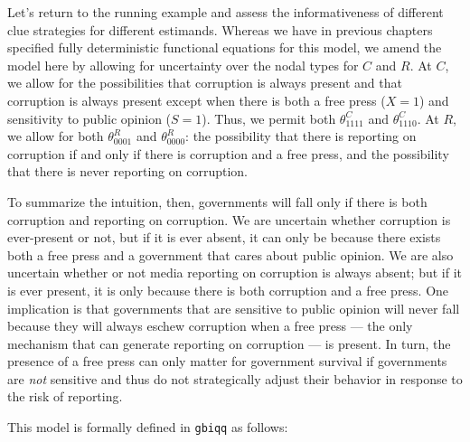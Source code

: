 \documentclass[
  12pt,
]{book}
\newenvironment{Shaded}{\begin{snugshade}}{\end{snugshade}}
\newcommand{\DataTypeTok}[1]{\textcolor[rgb]{0.13,0.29,0.53}{#1}}
\newcommand{\KeywordTok}[1]{\textcolor[rgb]{0.13,0.29,0.53}{\textbf{#1}}}
\newcommand{\NormalTok}[1]{#1}
\newcommand{\OperatorTok}[1]{\textcolor[rgb]{0.81,0.36,0.00}{\textbf{#1}}}
\newcommand{\OtherTok}[1]{\textcolor[rgb]{0.56,0.35,0.01}{#1}}
\newcommand{\StringTok}[1]{\textcolor[rgb]{0.31,0.60,0.02}{#1}}
\begin{document}
Let's return to the running example and assess the informativeness of different clue strategies for different estimands. Whereas we have in previous chapters specified fully deterministic functional equations for this model, we amend the model here by allowing for uncertainty over the nodal types for \(C\) and \(R\). At \(C\), we allow for the possibilities that corruption is always present and that corruption is always present except when there is both a free press (\(X=1\)) and sensitivity to public opinion (\(S=1\)). Thus, we permit both \(\theta^C_{1111}\) and \(\theta^C_{1110}\). At \(R\), we allow for both \(\theta^R_{0001}\) and \(\theta^R_{0000}\): the possibility that there is reporting on corruption if and only if there is corruption and a free press, and the possibility that there is never reporting on corruption.

To summarize the intuition, then, governments will fall only if there is both corruption and reporting on corruption. We are uncertain whether corruption is ever-present or not, but if it is ever absent, it can only be because there exists both a free press and a government that cares about public opinion. We are also uncertain whether or not media reporting on corruption is always absent; but if it is ever present, it is only because there is both corruption and a free press. One implication is that governments that are sensitive to public opinion will never fall because they will always eschew corruption when a free press --- the only mechanism that can generate reporting on corruption --- is present. In turn, the presence of a free press can only matter for government survival if governments are \emph{not} sensitive and thus do not strategically adjust their behavior in response to the risk of reporting.

This model is formally defined in \texttt{gbiqq} as follows:

\begin{Shaded}
\end{Shaded}
\end{document}
